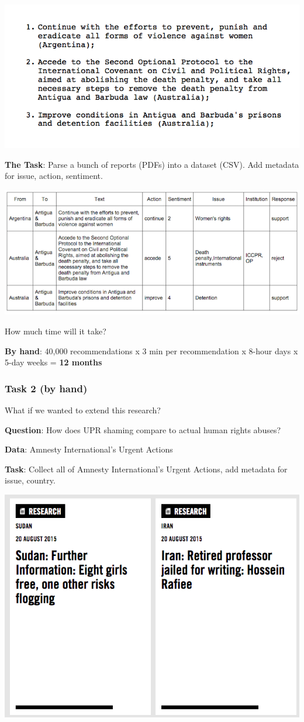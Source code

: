 \documentclass[]{book}
\begin{document}
\begin{center}\includegraphics[width=0.7\linewidth]{img/upr-text} \end{center}

\textbf{The Task}: Parse a bunch of reports (PDFs) into a dataset (CSV). Add metadata for issue, action, sentiment.

\begin{center}\includegraphics[width=0.7\linewidth]{img/upr-table} \end{center}

How much time will it take?

\textbf{By hand}: 40,000 recommendations x 3 min per recommendation x 8-hour days x 5-day weeks = \textbf{12 months}

\hypertarget{task-2-by-hand}{%
\subsubsection*{Task 2 (by hand)}\label{task-2-by-hand}}

What if we wanted to extend this research?

\textbf{Question}: How does UPR shaming compare to actual human rights abuses?

\textbf{Data}: Amnesty International's Urgent Actions

\textbf{Task}: Collect all of Amnesty International's Urgent Actions, add metadata for issue, country.

\begin{center}\includegraphics[width=0.7\linewidth]{img/amnesty} \end{center}
\end{document}
